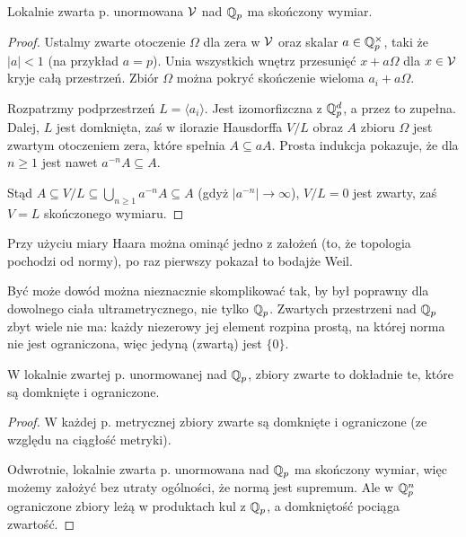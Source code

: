 \begin{fakt}
	Lokalnie zwarta p. unormowana $\mathcal V$ nad $\mathbb Q_p$ ma skończony wymiar.
\end{fakt}

\begin{proof}
	Ustalmy zwarte otoczenie $\Omega$ dla zera w $\mathcal V$ oraz skalar $a \in \mathbb Q_p^\times$, taki że $|a| < 1$ (na przykład $a = p$).
	Unia wszystkich wnętrz przesunięć $x + a \Omega$ dla $x \in \mathcal V$ kryje całą przestrzeń.
	Zbiór $\Omega$ można pokryć skończenie wieloma $a_i + a\Omega$.

	Rozpatrzmy podprzestrzeń $L = \langle a_i \rangle$.
	Jest izomorfizczna z $\mathbb Q_p^d$, a przez to zupełna.
	Dalej, $L$ jest domknięta, zaś w ilorazie Hausdorffa $V/L$ obraz $A$ zbioru $\Omega$ jest zwartym otoczeniem zera, które spełnia $A \subseteq aA$.
	Prosta indukcja pokazuje, że dla $n \ge 1$ jest nawet $a^{-n} A \subseteq A$.

	Stąd $A \subseteq V/L \subseteq \bigcup_{n \ge 1} a^{-n} A \subseteq A$ (gdyż $|a^{-n}| \to \infty$), $V/L = 0$ jest zwarty, zaś $V = L$ skończonego wymiaru.
\end{proof}

Przy użyciu miary Haara można ominąć jedno z założeń (to, że topologia pochodzi od normy), po raz pierwszy pokazał to bodajże Weil.

Być może dowód można nieznacznie skomplikować tak, by był poprawny dla dowolnego ciała ultrametrycznego, nie tylko $\mathbb Q_p$.
Zwartych przestrzeni nad $\mathbb Q_p$ zbyt wiele nie ma: każdy niezerowy jej element rozpina prostą, na której norma nie jest ograniczona, więc jedyną (zwartą) jest $\{0\}$.

\begin{wniosek}
	W lokalnie zwartej p. unormowanej nad $\mathbb Q_p$, zbiory zwarte to dokładnie te, które są domknięte i ograniczone.
\end{wniosek}

\begin{proof}
	W każdej p. metrycznej zbiory zwarte są domknięte i ograniczone (ze względu na ciągłość metryki).

	Odwrotnie, lokalnie zwarta p. unormowana nad $\mathbb Q_p$ ma skończony wymiar, więc możemy założyć bez utraty ogólności, że normą jest supremum.
	Ale w $\mathbb Q_p^n$ ograniczone zbiory leżą w produktach kul z $\mathbb Q_p$, a domkniętość pociąga zwartość.
\end{proof}
